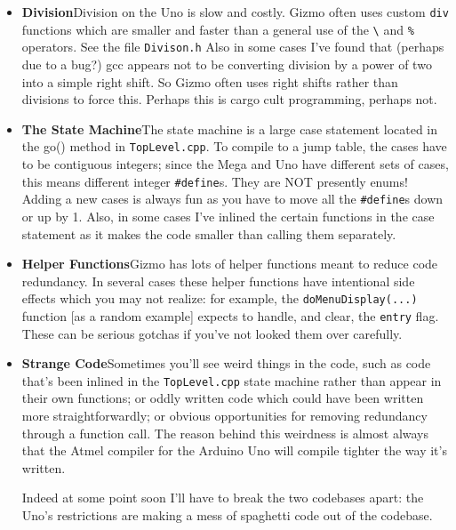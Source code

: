 \documentclass{article}
\begin{document}
\begin{itemize}

\item {\bf Division}\quad  Division on the Uno is slow and costly.  Gizmo often uses custom \texttt{div}
  functions which are smaller and faster than a general use of the \texttt{\textbackslash} and \texttt{\%}
  operators.  See the file \texttt{Divison.h}  Also in some cases I've found that (perhaps due to a bug?)
  gcc appears not to be converting division by a power of two into a simple right shift.
  So Gizmo often uses right shifts rather than divisions to force this.  Perhaps this
  is cargo cult programming, perhaps not.

\item {\bf The State Machine}\quad  The state machine is a large case statement located in the go()
  method in \texttt{TopLevel.cpp}. To compile to a jump table, the cases have to be contiguous
  integers; since the Mega and Uno have different sets of cases, this means different
  integer \texttt{\#define}s.  They are NOT presently enums!  Adding a new cases is always fun 
  as you have to move all the \texttt{\#define}s down or up by 1.   Also, in some cases I've 
  inlined the certain functions in the case statement as it makes the code smaller 
  than calling them separately.

\item {\bf Helper Functions}\quad  Gizmo has lots of helper functions meant to reduce code redundancy.
  In several cases these helper functions have intentional side effects which you may
  not realize: for example, the \texttt{doMenuDisplay(...)} function [as a random example] expects
  to handle, and clear, the \texttt{entry} flag.  These can be serious gotchas if you've not
  looked them over carefully.

\item {\bf Strange Code}\quad  Sometimes you'll see weird things in the code, such as code that's been inlined
 in the \texttt{TopLevel.cpp} state machine rather than appear in their own functions; or oddly written
 code which could have been written more straightforwardly; or obvious opportunities for removing
 redundancy through a function call.  The reason behind this weirdness is almost always that the
 Atmel compiler for the Arduino Uno will compile tighter the way it's written.
 
 Indeed at some point soon I'll have to break the two codebases apart: the Uno's restrictions are making a mess of
 spaghetti code out of the codebase.

\end{itemize}
\end{document}
